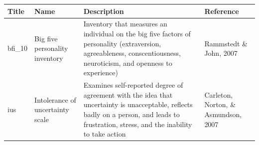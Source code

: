 \documentclass[]{book}
\begin{document}
\begin{longtable}[]{@{}llll@{}}
\toprule
\begin{minipage}[b]{0.22\columnwidth}\raggedright
Title\strut
\end{minipage} & \begin{minipage}[b]{0.27\columnwidth}\raggedright
Name\strut
\end{minipage} & \begin{minipage}[b]{0.22\columnwidth}\raggedright
Description\strut
\end{minipage} & \begin{minipage}[b]{0.18\columnwidth}\raggedright
Reference\strut
\end{minipage}\tabularnewline
\midrule
\endhead
\begin{minipage}[t]{0.22\columnwidth}\raggedright
bfi\_10\strut
\end{minipage} & \begin{minipage}[t]{0.27\columnwidth}\raggedright
Big five personality inventory\strut
\end{minipage} & \begin{minipage}[t]{0.22\columnwidth}\raggedright
Inventory that measures an individual on the big five factors of personality (extraversion, agreeableness, conscentiousness, neuroticism, and openness to experience)\strut
\end{minipage} & \begin{minipage}[t]{0.18\columnwidth}\raggedright
Rammstedt \& John, 2007\strut
\end{minipage}\tabularnewline
\begin{minipage}[t]{0.22\columnwidth}\raggedright
ius\strut
\end{minipage} & \begin{minipage}[t]{0.27\columnwidth}\raggedright
Intolerance of uncertainty scale\strut
\end{minipage} & \begin{minipage}[t]{0.22\columnwidth}\raggedright
Examines self-reported degree of agreement with the idea that uncertainty is unacceptable, reflects badly on a person, and leads to frustration, stress, and the inability to take action\strut
\end{minipage} & \begin{minipage}[t]{0.18\columnwidth}\raggedright
Carleton, Norton, \& Asmundson, 2007\strut
\end{minipage}\tabularnewline
\bottomrule
\end{longtable}
\end{document}
